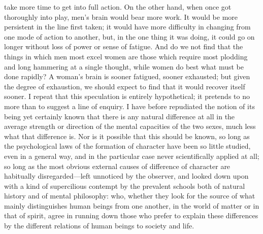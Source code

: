 \documentclass[12pt]{report}
\begin{document}
take more time to get into full action. On the other hand, when once got thoroughly into play, men's brain would bear more work. It would be more persistent in the line first taken; it would have more difficulty in changing from one mode of action to another, but, in the one thing it was doing, it could go on longer without loss of power or sense of fatigue. And do we not find that the things in which men most excel women are those which require most plodding and long hammering at a single thought, while women do best what must be done rapidly? A woman's brain is sooner fatigued, sooner exhausted; but given the degree of exhaustion, we should expect to find that it would recover itself sooner. I repeat that this speculation is entirely hypothetical; it pretends to no more than to suggest a line of enquiry. I have before repudiated the notion of its being yet certainly known that there is any natural difference at all in the average strength or direction of the mental capacities of the two sexes, much less what that difference is. Nor is it possible that this should be known, so long as the psychological laws of the formation of character have been so little studied, even in a general way, and in the particular case never scientifically applied at all; so long as the most obvious external causes of difference of character are habitually disregarded—left unnoticed by the observer, and looked down upon with a kind of supercilious contempt by the prevalent schools both of natural history and of mental philosophy: who, whether they look for the source of what mainly distinguishes human beings from one another, in the world of matter or in that of spirit, agree in running down those who prefer to explain these differences by the different relations of human beings to society and life.
\end{document}
